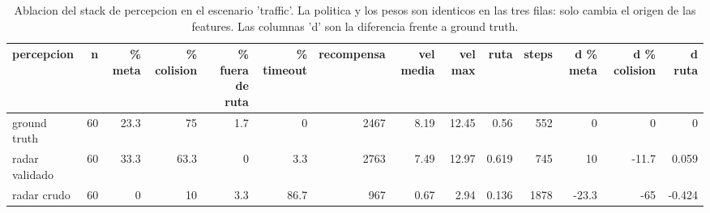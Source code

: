 \begin{table}[htbp]
  \centering
  \begin{tabular}{lrrrrrrrrrrrrr}
    \toprule
    percepcion & n & \% meta & \% colision & \% fuera de ruta & \% timeout & recompensa & vel media & vel max & ruta & steps & d \% meta & d \% colision & d ruta \\
    \midrule
    ground truth & 60 & 23.3 & 75 & 1.7 & 0 & 2467 & 8.19 & 12.45 & 0.56 & 552 & 0 & 0 & 0 \\
    radar validado & 60 & 33.3 & 63.3 & 0 & 3.3 & 2763 & 7.49 & 12.97 & 0.619 & 745 & 10 & -11.7 & 0.059 \\
    radar crudo & 60 & 0 & 10 & 3.3 & 86.7 & 967 & 0.67 & 2.94 & 0.136 & 1878 & -23.3 & -65 & -0.424 \\
    \bottomrule
  \end{tabular}
  \caption{Ablacion del stack de percepcion en el escenario 'traffic'. La politica y los pesos son identicos en las tres filas: solo cambia el origen de las features. Las columnas 'd' son la diferencia frente a ground truth.}
  \label{tab:ablacion_percepcion}
\end{table}
